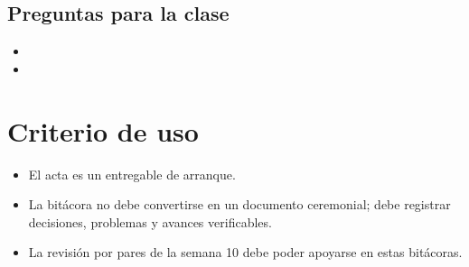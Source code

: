 \documentclass[11pt]{article}
\begin{document}
\subsection*{Preguntas para la clase}
\begin{itemize}
\item
\item
\end{itemize}

\section{Criterio de uso}
\begin{itemize}
\item El acta es un entregable de arranque.
\item La bit\'acora no debe convertirse en un documento ceremonial; debe registrar decisiones, problemas y avances verificables.
\item La revisi\'on por pares de la semana 10 debe poder apoyarse en estas bit\'acoras.
\end{itemize}
\end{document}
